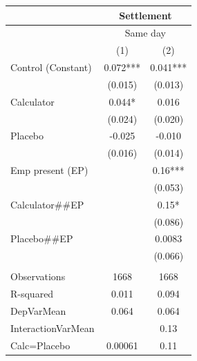 \begin{tabular}{lcc}
\toprule
      & \multicolumn{2}{c}{Settlement} \\
\midrule
      & \multicolumn{2}{c}{Same day} \\
\midrule
\midrule
      & (1)   & (2) \\
\midrule
\midrule
Control (Constant) & 0.072*** & 0.041*** \\
      & (0.015) & (0.013) \\
Calculator   & 0.044* & 0.016 \\
      & (0.024) & (0.020) \\
Placebo  & -0.025 & -0.010 \\
      & (0.016) & (0.014) \\
Emp present (EP) &       & 0.16*** \\
      &       & (0.053) \\
Calculator\#\#EP &       & 0.15* \\
      &       & (0.086) \\
Placebo\#\#EP &       & 0.0083 \\
      &       & (0.066) \\
      &       &  \\
\midrule
Observations & 1668  & 1668 \\
R-squared & 0.011 & 0.094 \\
DepVarMean & 0.064 & 0.064 \\
InteractionVarMean &       & 0.13 \\
Calc=Placebo & 0.00061 & 0.11 \\
\bottomrule
\bottomrule
\end{tabular}%
